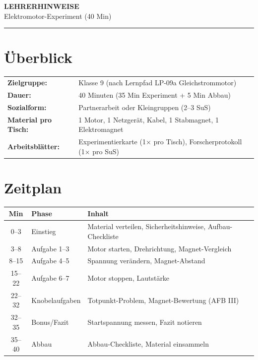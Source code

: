 \documentclass[11pt, a4paper]{article}
\begin{document}
\begin{center}
    {\Large\bfseries\textcolor{fachfarbe}{LEHRERHINWEISE}}\\[0.3em]
    {\large Elektromotor-Experiment (40 Min)}
\end{center}
\hrule
\vspace{0.5em}


\section*{Überblick}

\begin{tabularx}{\textwidth}{@{}lX@{}}
\textbf{Zielgruppe:} & Klasse 9 (nach Lernpfad LP-09a Gleichstrommotor) \\
\textbf{Dauer:} & 40 Minuten (35 Min Experiment + 5 Min Abbau) \\
\textbf{Sozialform:} & Partnerarbeit oder Kleingruppen (2--3 SuS) \\
\textbf{Material pro Tisch:} & 1 Motor, 1 Netzgerät, Kabel, 1 Stabmagnet, 1 Elektromagnet \\
\textbf{Arbeitsblätter:} & Experimentierkarte (1× pro Tisch), Forscherprotokoll (1× pro SuS) \\
\end{tabularx}


\section*{Zeitplan}

\begin{tabularx}{\textwidth}{@{}c|l|X@{}}
\toprule
\textbf{Min} & \textbf{Phase} & \textbf{Inhalt} \\
\midrule
0--3 & Einstieg & Material verteilen, Sicherheitshinweise, Aufbau-Checkliste \\
3--8 & Aufgabe 1--3 & Motor starten, Drehrichtung, Magnet-Vergleich \\
8--15 & Aufgabe 4--5 & Spannung verändern, Magnet-Abstand \\
15--22 & Aufgabe 6--7 & Motor stoppen, Lautstärke \\
22--32 & Knobelaufgaben & Totpunkt-Problem, Magnet-Bewertung (AFB III) \\
32--35 & Bonus/Fazit & Startspannung messen, Fazit notieren \\
35--40 & Abbau & Abbau-Checkliste, Material einsammeln \\
\bottomrule
\end{tabularx}
\end{document}
